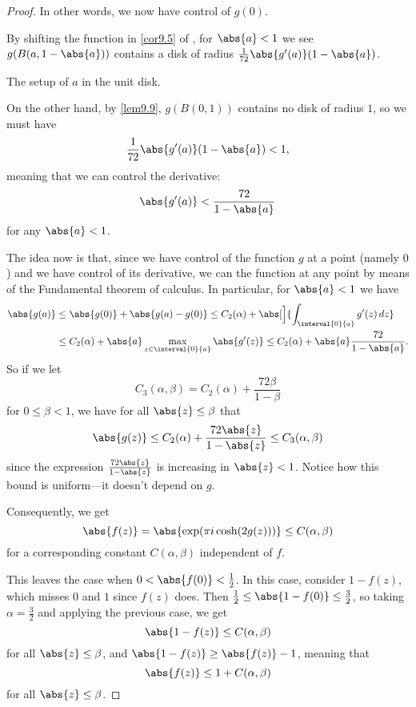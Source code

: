 \begin{proof}
	In other words, we now have control of $g(0)$.

	By shifting the function in \autoref{cor9.5} of , for $\abs{a} < 1$ we see $g(B(a, 1 - \abs{a}))$ contains a disk of radius $\frac{1}{72} \abs{g'(a)} (1 - \abs{a})$.

	\begin{marginfigure}

		\caption{\label{thm911:fig} The setup of $a$ in the unit disk.}
	\end{marginfigure}

	On the other hand, by \autoref{lem9.9}, $g(B(0, 1))$ contains no disk of radius $1$, so we must have
	\[
		\frac{1}{72} \abs{g'(a)} (1 - \abs{a}) < 1,
	\]
	meaning that we can control the derivative:
	\[
		\abs{g'(a)} < \frac{72}{1 - \abs{a}}
	\]
	for any $\abs{a} < 1$.

	The idea now is that, since we have control of the function $g$ at a point (namely $0$) and we have control of its derivative, we can the function at any point by means of the Fundamental theorem of calculus.
	In particular, for $\abs{a} < 1$ we have
	\begin{align*}
		\abs{g(a)} &\leq \abs{g(0)} + \abs{g(a) - g(0)} \leq C_2(\alpha) + \abs[\Big]{\int_{\interval{0}{a}} g'(z) \, d z} \\
		&\leq C_2(\alpha) + \abs{a} \max_{z \in \interval{0}{a}} \abs{g'(z)} \leq C_2(\alpha) + \abs{a} \frac{72}{1 - \abs{a}}.
	\end{align*}
	So if we let
	\[
		C_3(\alpha, \beta) = C_2(\alpha) + \frac{72 \beta}{1 - \beta}
	\]
	for $0 \leq \beta < 1$, we have for all $\abs{z} \leq \beta$ that
	\[
		\abs{g(z)} \leq C_2(\alpha) + \frac{72 \abs{z}}{1 - \abs{z}} \leq C_3(\alpha, \beta)
	\]
	since the expression $\frac{72 \abs{z}}{1 - \abs{z}}$ is increasing in $\abs{z} < 1$.
	Notice how this bound is uniform---it doesn't depend on $g$.

	Consequently, we get
	\[
		\abs{f(z)} = \abs{\exp(\pi i \cosh(2 g(z)))} \leq C(\alpha, \beta)
	\]
	for a corresponding constant $C(\alpha, \beta)$ independent of $f$.

	This leaves the case when $0 < \abs{f(0)} < \frac{1}{2}$.
	In this case, consider $1 - f(z)$, which misses $0$ and $1$ since $f(z)$ does.
	Then $\frac{1}{2} \leq \abs{1 - f(0)} \leq \frac{3}{2}$, so taking $\alpha = \frac{3}{2}$ and applying the previous case, we get
	\[
		\abs{1 - f(z)} \leq C(\alpha, \beta)
	\]
	for all $\abs{z} \leq \beta$, and $\abs{1 - f(z)} \geq \abs{f(z)} - 1$, meaning that
	\[
		\abs{f(z)} \leq 1 + C(\alpha, \beta)
	\]
	for all $\abs{z} \leq \beta$.
\end{proof}

